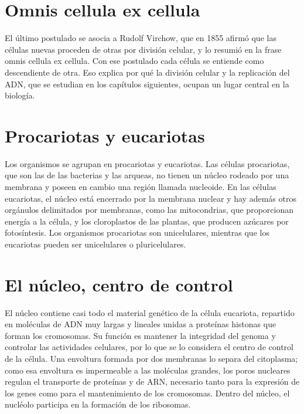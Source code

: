 \documentclass{book}
\begin{document}

\section{Omnis cellula ex cellula}

El último postulado se asocia a Rudolf Virchow, que en 1855 afirmó que las células nuevas proceden de otras por división celular, y lo resumió en la frase omnis cellula ex cellula. Con ese postulado cada célula se entiende como descendiente de otra. Eso explica por qué la división celular y la replicación del ADN, que se estudian en los capítulos siguientes, ocupan un lugar central en la biología.


\section{Procariotas y eucariotas}

Los organismos se agrupan en procariotas y eucariotas. Las células procariotas, que son las de las bacterias y las arqueas, no tienen un núcleo rodeado por una membrana y poseen en cambio una región llamada nucleoide. En las células eucariotas, el núcleo está encerrado por la membrana nuclear y hay además otros orgánulos delimitados por membranas, como las mitocondrias, que proporcionan energía a la célula, y los cloroplastos de las plantas, que producen azúcares por fotosíntesis. Los organismos procariotas son unicelulares, mientras que los eucariotas pueden ser unicelulares o pluricelulares.


\section{El núcleo, centro de control}

El núcleo contiene casi todo el material genético de la célula eucariota, repartido en moléculas de ADN muy largas y lineales unidas a proteínas histonas que forman los cromosomas. Su función es mantener la integridad del genoma y controlar las actividades celulares, por lo que se lo considera el centro de control de la célula. Una envoltura formada por dos membranas lo separa del citoplasma; como esa envoltura es impermeable a las moléculas grandes, los poros nucleares regulan el transporte de proteínas y de ARN, necesario tanto para la expresión de los genes como para el mantenimiento de los cromosomas. Dentro del núcleo, el nucléolo participa en la formación de los ribosomas.
\end{document}
